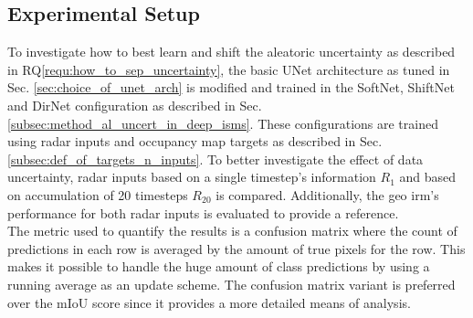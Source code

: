 \subsection{Experimental Setup}
\label{subsec:exp_setup_aleat_uncert}
To investigate how to best learn and shift the aleatoric uncertainty as described in RQ\ref{requ:how_to_sep_uncertainty}, the basic UNet architecture as tuned in Sec. \ref{sec:choice_of_unet_arch} is modified and trained in the SoftNet, ShiftNet and DirNet configuration as described in Sec. \ref{subsec:method_al_uncert_in_deep_isms}. These configurations are trained using radar inputs and occupancy map targets as described in Sec. \ref{subsec:def_of_targets_n_inputs}. To better investigate the effect of data uncertainty, radar inputs based on a single timestep's information $R_1$ and based on accumulation of 20 timesteps $R_20$ is compared. Additionally, the geo \gls{irm}'s performance for both radar inputs is evaluated to provide a reference.
\\
The metric used to quantify the results is a confusion matrix where the count of predictions in each row is averaged by the amount of true pixels for the row. This makes it possible to handle the huge amount of class predictions by using a running average as an update scheme. The confusion matrix variant is preferred over the mIoU score since it provides a more detailed means of analysis. 
%
